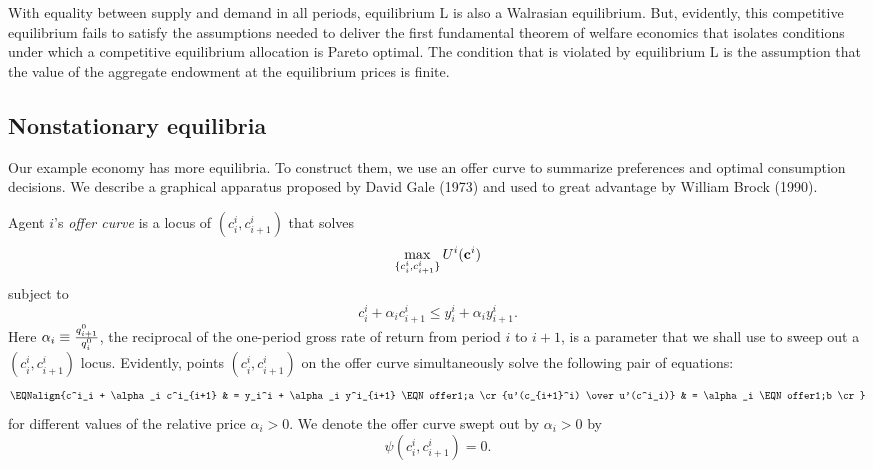With equality between supply and demand in all
periods, equilibrium L is also a Walrasian equilibrium.
But, evidently, this competitive equilibrium
fails to satisfy
  the assumptions needed to deliver the
   first fundamental theorem of welfare economics that isolates conditions under which
 a competitive equilibrium allocation is Pareto
optimal.
  The condition that is violated by  equilibrium L
is the assumption that the value of the aggregate endowment
at the equilibrium prices is finite.

\subsection{Nonstationary equilibria}\label{sec:olg_nonstat}%

\noindent 
Our example economy has more  equilibria.
To construct  them, we use an offer curve to summarize preferences and optimal consumption
decisions.   We describe a graphical apparatus proposed
by David Gale (1973) and used  to great advantage by
William Brock (1990).
%
%

\medskip
{}  Agent $i$'s {\it offer curve} is
a locus of $(c_i^i, c^i_{i+1})$ that solves
$$ \max_{\{c_i^i, c^i_{i+1}\}} U^i({\bf c}^i)  $$
subject to
$$ c_i^i + \alpha_i c_{i+1}^i \leq y_i^i + \alpha_i y^i_{i+1} .$$
Here $\alpha_i \equiv {q^0_{i+1}\over q^0_i } $,
 the reciprocal
of the one-period gross rate of return from period $i$ to $i+1$,  is 
a parameter that we shall use to sweep out a $(c_i^i, c_{i+1}^i)$ locus.
\medskip
Evidently, points $(c_i^i, c_{i+1}^i)$ on
 the offer curve simultaneously solve the following pair of equations:
$$\EQNalign{c^i_i + \alpha_i c^i_{i+1} 
        & = y_i^i + \alpha_i y^i_{i+1} \EQN offer1;a  \cr
            {u'(c_{i+1}^i) \over u'(c^i_i)} & = \alpha_i   
                                        \EQN offer1;b  \cr}$$
for  different values of the relative price $\alpha_i > 0$.  
We denote the offer curve  swept out by $\alpha_i > 0 $  by
$$ \psi(c^i_i, c^i_{i+1}) = 0 .$$


